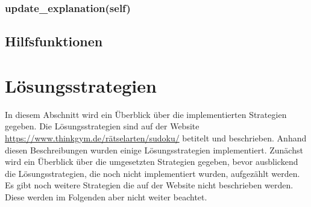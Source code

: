 \subsubsection{update\_explanation(self)}

\subsection{Hilfsfunktionen}

\section{Lösungsstrategien}

In diesem Abschnitt wird ein Überblick über die implementierten Strategien gegeben. Die Lösungsstrategien sind auf der Website \url{https://www.thinkgym.de/rätselarten/sudoku/} betitelt und beschrieben. Anhand diesen Beschreibungen wurden einige Lösungsstrategien implementiert. Zunächst wird ein Überblick über die umgesetzten Strategien gegeben, bevor ausblickend die Lösungsstrategien, die noch nicht implementiert wurden, aufgezählt werden. Es gibt noch weitere Strategien die auf der Website nicht beschrieben werden. Diese werden im Folgenden aber nicht weiter beachtet.

